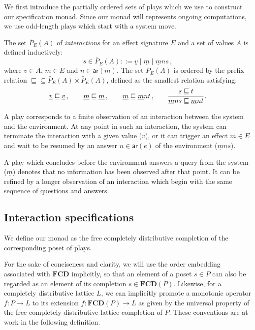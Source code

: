 \documentclass[sigplan,screen]{acmart}
\newcommand{\kw}[1]{\ensuremath{ \mathsf{#1} }}
\begin{document}
We first introduce the partially ordered sets of plays
which we use to construct our specification monad.
Since our monad will represents ongoing computations,
we use odd-length plays which start with a system move.

\begin{definition}
The set $\bar{P}_E(A)$ of \emph{interactions}
for an effect signature $E$ and a set of values $A$
is defined inductively:
\[
  s \in \bar{P}_E(A) ::=
    \underline{v} \mid
    \underline{m} \mid
    \underline{m} n s \,,
\]
where $v \in A$, $m \in E$ and $n \in \kw{ar}(m)$.
The set $\bar{P}_E(A)$ is ordered by the prefix relation
${\sqsubseteq} \subseteq \bar{P}_E(A) \times \bar{P}_E(A)$,
defined
as the smallest relation satisfying:
\[
  \underline{v} \sqsubseteq \underline{v} \,, \qquad
  \underline{m} \sqsubseteq \underline{m} \,, \qquad
  \underline{m} \sqsubseteq \underline{m} n t \,, \qquad
  \begin{prooftree}
    \hypo{s \sqsubseteq t}
    \infer1{\underline{m} n s \sqsubseteq \underline{m} n t}
  \end{prooftree} \,.
\]
\end{definition}

A play corresponds to a finite observation of
an interaction between the system and the environment.
At any point in such an interaction,
the system can terminate the interaction with a given value ($v$),
or it can trigger an effect $m \in E$ and
wait to be resumed by
an answer $n \in \kw{ar}(e)$ of the environment
($\underline{m} n s$).

A play which concludes before
the environment answers a query from the system ($\underline{m}$)
denotes that no information has been observed after that point.
It can be refined by a longer observation
of an interaction which begin with the same sequence of
questions and answers.


\subsection{Interaction specifications} %

We define our monad as the free completely distributive completion
of the corresponding poset of plays.

For the sake of conciseness and clarity,
we will use the order embedding associated with $\mathbf{FCD}$
implicitly,
so that an element of a poset $s \in P$
can also be regarded as an element of
its completion $s \in \mathbf{FCD}(P)$.
Likewise,
for a completely distributive lattice $L$,
we can implicitly
promote a monotonic operator
$f : P \rightarrow L$
to its extension
$f : \mathbf{FCD}(P) \rightarrow L$
as given by the universal property of
the free completely distributive lattice completion of $P$.
These conventions are at work
in the following definition.
\end{document}
